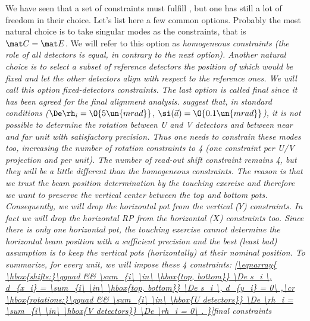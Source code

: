 We have seen that a set of constraints must fulfill , but one has still a lot of freedom in their choice. Let's list here a few common options.
\> Probably the most natural choice is to take singular modes as the constraints, that is $\mat C = \mat E$. We will refer to this option as \em{homogeneous} constraints (the role of all detectors is equal, in contrary to the next option). 
\> Another natural choice is to select a subset of reference detectors the position of which would be fixed and let the other detectors align with respect to the reference ones. We will call this option \em{fixed-detectors} constraints. 
\> The last option is called \em{final} since it has been agreed for the final alignment analysis.  suggest that, in standard conditions ($\De\rh_i = \O{5\un{mrad}}$, $\si(\vec a)=\O{0.1\un{mrad}}$), it is not possible to determine the rotation between U and V detectors and between near and far unit
with satisfactory precision. Thus one needs to constrain these modes too, increasing the number of rotation constraints to 4 (one constraint per U/V projection and per unit). The number of read-out shift constraint remains 4, but they will be a little different than the homogeneous constraints. The reason is that we trust the beam position determination by the touching exercise and therefore we want to preserve the vertical center between the top and bottom pots. Consequently, we will drop the horizontal pot from the vertical ($Y$) constraints. In fact we will drop the horizontal RP from the horizontal ($X$) constraints too. Since there is only one horizontal pot, the touching exercise cannot determine the horizontal beam position with a sufficient precision and the best (least bad) assumption is to keep the vertical pots (horizontally) at their nominal position. To summarize, for every unit, we will impose these 4 constraints:
\eqref{\eqnarray{
\hbox{shifts:}\qquad && \sum_{i\ \in\ \hbox{top, bottom}} \De s_i \, d_{x_i} = \sum_{i\ \in\ \hbox{top, bottom}} \De s_i \, d_{y_i} = 0\ ,\cr
\hbox{rotations:}\qquad && \sum_{i\ \in\ \hbox{U detectors}} \De \rh_i = \sum_{i\ \in\ \hbox{V detectors}} \De \rh_i = 0\ .
}}{final constraints}

